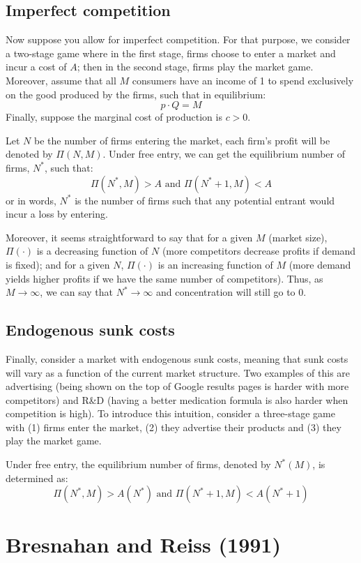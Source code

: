 \subsection{Imperfect competition}

Now suppose you allow for imperfect competition. For that purpose, we consider a two-stage game where in the first stage, firms choose to enter a market and incur a cost of $A$; then in the second stage, firms play the market game. Moreover, assume that all $M$ consumers have an income of 1 to spend exclusively on the good produced by the firms, such that in equilibrium: $$p\cdot Q = M$$ Finally, suppose the marginal cost of production is $c>0$.

Let $N$ be the number of firms entering the market, each firm's profit will be denoted by $\Pi(N, M)$. Under free entry, we can get the equilibrium number of firms, $N^*$, such that: $$ \Pi(N^*, M) > A \text{ and } \Pi(N^*+1, M) < A $$ or in words, $N^*$ is the number of firms such that any potential entrant would incur a loss by entering.

Moreover, it seems straightforward to say that for a given $M$ (market size), $\Pi(\cdot)$ is a decreasing function of $N$ (more competitors decrease profits if demand is fixed); and for a given $N$, $\Pi(\cdot)$ is an increasing function of $M$ (more demand yields higher profits if we have the same number of competitors). Thus, as $M \to \infty$, we can say that $N^* \to \infty$ and concentration will still go to 0.

\subsection{Endogenous sunk costs}

Finally, consider a market with endogenous sunk costs, meaning that sunk costs will vary as a function of the current market structure. Two examples of this are advertising (being shown on the top of Google results pages is harder with more competitors) and R\&D (having a better medication formula is also harder when competition is high). To introduce this intuition, consider a three-stage game with (1) firms enter the market, (2) they advertise their products and (3) they play the market game.

Under free entry, the equilibrium number of firms, denoted by $N^*(M)$, is determined as: $$ \Pi(N^*, M) > A(N^*) \text{ and } \Pi(N^* + 1, M) < A(N^* + 1) $$

\section{Bresnahan and Reiss (1991)}

